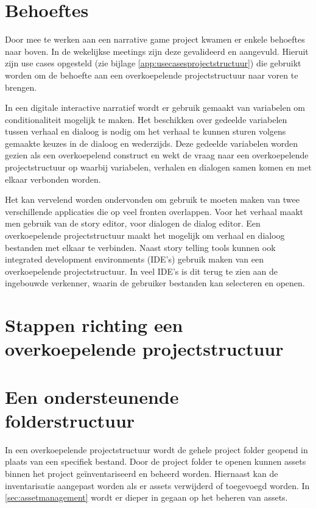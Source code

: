 \section{Behoeftes}
Door mee te werken aan een narrative game project kwamen er enkele behoeftes naar boven. In de wekelijkse meetings zijn deze gevalideerd en aangevuld. Hieruit zijn use cases opgesteld (zie bijlage \autoref{app:usecasesprojectstructuur}) die gebruikt worden om de behoefte aan een overkoepelende projectstructuur naar voren te brengen. 

In een digitale interactive narratief wordt er gebruik gemaakt van variabelen om conditionaliteit mogelijk te maken. Het beschikken over gedeelde variabelen tussen verhaal en dialoog is nodig om het verhaal te kunnen sturen volgens gemaakte keuzes in de dialoog en wederzijds. Deze gedeelde variabelen worden gezien als een overkoepelend construct en wekt de vraag naar een overkoepelende projectstructuur op waarbij variabelen, verhalen en dialogen samen komen en met elkaar verbonden worden.

Het kan vervelend worden ondervonden om gebruik te moeten maken van twee verschillende applicaties die op veel fronten overlappen. Voor het verhaal maakt men gebruik van de story editor, voor dialogen de dialog editor. Een overkoepelende projectstructuur maakt het mogelijk om verhaal en dialoog bestanden met elkaar te verbinden. Naast story telling tools kunnen ook integrated development environments (IDE's) gebruik maken van een overkoepelende projectstructuur. In veel IDE's is dit terug te zien aan de ingebouwde verkenner, waarin de gebruiker bestanden kan selecteren en openen.




\section{Stappen richting een overkoepelende projectstructuur}



\section{Een ondersteunende folderstructuur}
In een overkoepelende projectstructuur wordt de gehele project folder geopend in plaats van een specifiek bestand. Door de project folder te openen kunnen assets binnen het project geïnventariseerd en beheerd worden. Hiernaast kan de inventarisatie aangepast worden als er assets verwijderd of toegevoegd worden. In \autoref{sec:assetmanagement} wordt er dieper in gegaan op het beheren van assets.

